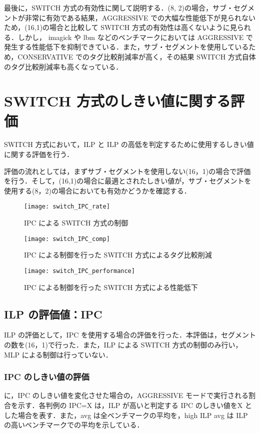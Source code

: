 最後に，SWITCH 方式の有効性に関して説明する．(8, 2)の場合，サブ・セグメントが非常に有効である結果，AGGRESSIVE での大幅な性能低下が見られないため，(16,1)の場合と比較して SWITCH 方式の有効性は高くないように見られる．しかし， imagick や lbm などのベンチマークにおいては AGGRESSIVE で発生する性能低下を抑制できている．また，サブ・セグメントを使用しているため，CONSERVATIVE でのタグ比較削減率が高く，その結果 SWITCH 方式自体のタグ比較削減率も高くなっている．

\section{SWITCH 方式のしきい値に関する評価}
SWITCH 方式において，ILP と ILP の高低を判定するために使用するしきい値に関する評価を行う．

評価の流れとしては，まずサブ・セグメントを使用しない(16，1)の場合で評価を行う．そして，(16,1)の場合に最適とされたしきい値が，サブ・セグメントを使用する(8，2)の場合においても有効かどうかを確認する．

\begin{figure}[htb]
  \centering
  \texttt{[image: switch\_IPC\_rate]}
  \caption{IPC による SWITCH 方式の制御}
  \label{fig:switch_IPC_rate}
\end{figure}
\begin{figure}[htb]
  \centering
  \texttt{[image: switch\_IPC\_comp]}
  \caption{IPC による制御を行った SWITCH 方式によるタグ比較削減}
  \label{fig:switch_IPC_comp}
\end{figure}
\begin{figure}[htb]
  \centering
  \texttt{[image: switch\_IPC\_performance]}
  \caption{IPC による制御を行った SWITCH 方式による性能低下}
  \label{fig:switch_IPC_performance}
\end{figure}

\subsection{ILP の評価値：IPC}
ILP の評価として，IPC を使用する場合の評価を行った．本評価は，セグメントの数を(16，1)で行った．また，ILP による SWITCH 方式の制御のみ行い，MLP による制御は行っていない．

\subsubsection{IPC のしきい値の評価}
に，IPC のしきい値を変化させた場合の，AGGRESSIVE モードで実行される割合を示す．各判例の IPC=X は，ILP が高いと判定する IPC のしきい値をX とした場合を表す．また，avg は全ベンチマークの平均を，high ILP avg は ILP の高いベンチマークでの平均を示している． 

